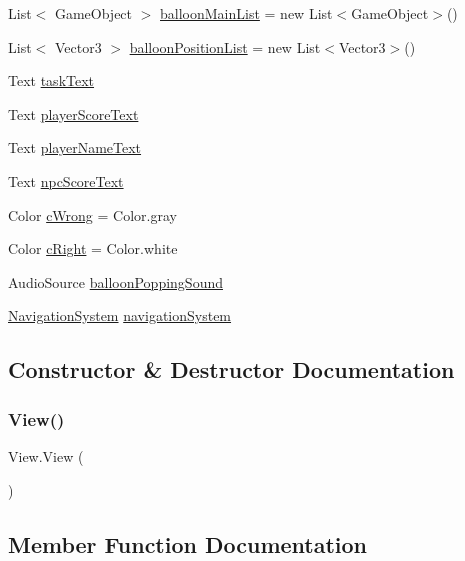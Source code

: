\begin{DoxyCompactItemize}
\item 
List$<$ Game\+Object $>$ \hyperlink{classView_a7e98040704d8238e9a2002d9a6ad8971}{balloon\+Main\+List} = new List$<$Game\+Object$>$()
\item 
List$<$ Vector3 $>$ \hyperlink{classView_ad4d9a01ca0600eca1bbb2304399de812}{balloon\+Position\+List} = new List$<$Vector3$>$()
\item 
Text \hyperlink{classView_a046ed9689af065a613d9bc169952b6ea}{task\+Text}
\item 
Text \hyperlink{classView_a9743e2966354094f2078593bc04c64e3}{player\+Score\+Text}
\item 
Text \hyperlink{classView_aef06655ff7a3a1af1fa1df035e147324}{player\+Name\+Text}
\item 
Text \hyperlink{classView_a824504d7a36642711e793df9b5de12b6}{npc\+Score\+Text}
\item 
Color \hyperlink{classView_a2e814ae916d1d796691e15899af94940}{c\+Wrong} = Color.\+gray
\item 
Color \hyperlink{classView_a5f3012dbcce0ef379184c6e672d8fd5d}{c\+Right} = Color.\+white
\item 
Audio\+Source \hyperlink{classView_a953e9a636c7a299f8d367caf25f1e030}{balloon\+Popping\+Sound}
\item 
\hyperlink{classNavigationSystem}{Navigation\+System} \hyperlink{classView_a983ba5bf73850b60e7a45b50c7a1d776}{navigation\+System}
\end{DoxyCompactItemize}


\subsection{Constructor \& Destructor Documentation}
\mbox{\label{classView_a218e935db0c3320275ff8a56637d2f47}} 
\subsubsection{\texorpdfstring{View()}{View()}}
{\footnotesize\ttfamily View.\+View (\begin{DoxyParamCaption}{ }\end{DoxyParamCaption})\hspace{0.3cm}{\ttfamily [inline]}}



\subsection{Member Function Documentation}
\mbox{\label{classView_a89b76b661b1bb6511d4b86ff3cf6a0b0}} 
